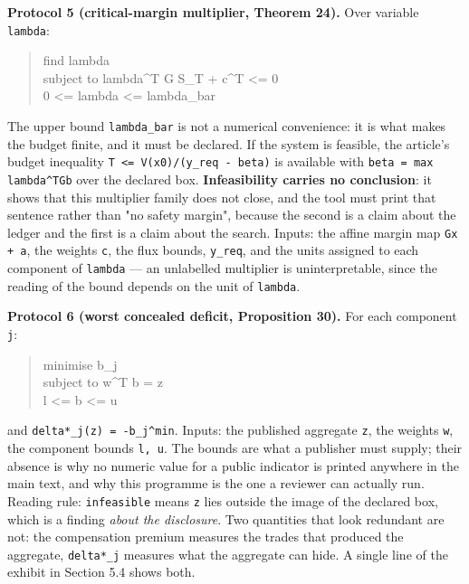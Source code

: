\documentclass[11pt]{article}
\begin{document}
\textbf{Protocol 5 (critical-margin multiplier, Theorem 24).} Over variable \texttt{lambda}:

\begin{quote}\ttfamily\footnotesize\raggedright\setlength{\parskip}{0pt}
find   lambda\\
subject to lambda\textasciicircum{}T G S\_T + c\textasciicircum{}T <= 0\\
           0 <= lambda <= lambda\_bar
\end{quote}

The upper bound \texttt{lambda\_bar} is not a numerical convenience: it is what makes the budget finite, and it must be declared. If the system is feasible, the article's budget inequality \texttt{T <= V(x0)/(y\_req - beta)} is available with \texttt{beta = max lambda\textasciicircum{}TGb} over the declared box. \textbf{Infeasibility carries no conclusion}: it shows that this multiplier family does not close, and the tool must print that sentence rather than "no safety margin", because the second is a claim about the ledger and the first is a claim about the search. Inputs: the affine margin map \texttt{Gx + a}, the weights \texttt{c}, the flux bounds, \texttt{y\_req}, and the units assigned to each component of \texttt{lambda} --- an unlabelled multiplier is uninterpretable, since the reading of the bound depends on the unit of \texttt{lambda}.

\textbf{Protocol 6 (worst concealed deficit, Proposition 30).} For each component \texttt{j}:

\begin{quote}\ttfamily\footnotesize\raggedright\setlength{\parskip}{0pt}
minimise   b\_j\\
subject to w\textasciicircum{}T b = z\\
           l <= b <= u
\end{quote}

and \texttt{delta*\_j(z) = -b\_j\textasciicircum{}min}. Inputs: the published aggregate \texttt{z}, the weights \texttt{w}, the component bounds \texttt{l, u}. The bounds are what a publisher must supply; their absence is why no numeric value for a public indicator is printed anywhere in the main text, and why this programme is the one a reviewer can actually run. Reading rule: \texttt{infeasible} means \texttt{z} lies outside the image of the declared box, which is a finding \emph{about the disclosure}. Two quantities that look redundant are not: the compensation premium measures the trades that produced the aggregate, \texttt{delta*\_j} measures what the aggregate can hide. A single line of the exhibit in Section 5.4 shows both.
\end{document}
